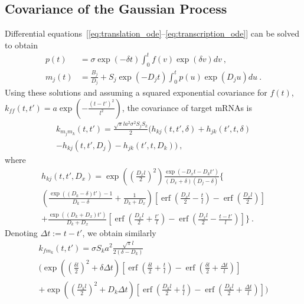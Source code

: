 \documentclass{pnastwo}
\newcommand{\erf}{\operatorname{erf}}
\begin{document}
\begin{article}
\begin{materials}
  \section{Covariance of the Gaussian Process}
  Differential
  equations~[\ref{eq:translation_ode}--\ref{eq:transcription_ode}]
  can be solved to obtain
  \begin{align*}
    p(t) &= \sigma \exp(-\delta t) \int_0^t f(v) \exp(\delta v) dv\ , \\
    m_j(t) &= \frac{B_j}{D_j} + S_j \exp(-D_j t) \int_0^t p(u)
    \exp(D_j u) du\ .
  \end{align*}
  Using these solutions and assuming a squared exponential covariance
  for $f(t)$, $k_{ff}(t, t') = a \exp\left( -\frac{(t-t')^2}{l^2}
  \right)$, the covariance of target mRNAs is
  \begin{multline*}
    k_{m_j m_k}(t, t')
    = \frac{\sqrt{\pi} l a^2 \sigma^2 S_j S_k}{2} \bigg(
    h_{kj}(t, t', \delta) + h_{jk}(t', t, \delta) \\
    - h_{kj}(t, t', D_j) - h_{jk}(t', t, D_k)
    \bigg)\ ,
  \end{multline*}
  where
  \begin{multline*}
    h_{kj}(t, t', D_x) = 
    \exp\left(\left(\frac{D_x l}{2}\right)^2\right)
    \frac{\exp(-D_x t - D_k t')}{(D_x + \delta) (D_j - \delta)}
    \bigg\{ 
    \\
    \left(\frac{\exp((D_k-\delta) t') - 1}{D_k-\delta} +
      \frac{1}{D_k + D_x} \right)
    [\erf(\frac{D_x l}{2} - \frac{t}{l}) - \erf(\frac{D_x l}{2})]
    \\
    + \frac{\exp((D_k+D_x)t')}{D_k+D_x}
    [\erf(\frac{D_x l}{2} + \frac{t'}{l})
    - \erf(\frac{D_x l}{2} - \frac{t-t'}{l})]
    \bigg\}\ .
  \end{multline*}
  Denoting $\Delta t := t - t'$, we obtain similarly
  \begin{multline*}
    k_{f m_k}(t, t')
    = \sigma S_k a^2 \frac{\sqrt{\pi} l}{2(\delta - D_k)} \\
    \bigg(
    \exp\left(\left(\frac{\delta l}{2}\right)^2 + \delta \Delta t\right)
    [\erf(\frac{\delta l}{2} + \frac{t}{l}) - \erf(\frac{\delta l}{2} + \frac{\Delta t}{l})] \\
    +
    \exp\left(\left(\frac{D_k l}{2}\right)^2 + D_k \Delta t \right)
    [\erf(\frac{D_k l}{2} + \frac{t}{l}) - \erf(\frac{D_k l}{2} + \frac{\Delta t}{l})]
    \bigg)
  \end{multline*}


\end{materials}
\end{article}
\end{document}
